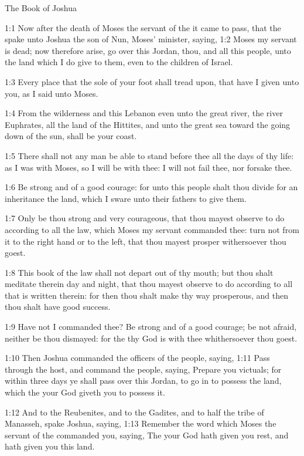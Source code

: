 The Book of Joshua


1:1 Now after the death of Moses the servant of the \LORD it came to
pass, that the \LORD spake unto Joshua the son of Nun, Moses' minister,
saying, 1:2 Moses my servant is dead; now therefore arise, go over
this Jordan, thou, and all this people, unto the land which I do give
to them, even to the children of Israel.

1:3 Every place that the sole of your foot shall tread upon, that have
I given unto you, as I said unto Moses.

1:4 From the wilderness and this Lebanon even unto the great river,
the river Euphrates, all the land of the Hittites, and unto the great
sea toward the going down of the sun, shall be your coast.

1:5 There shall not any man be able to stand before thee all the days
of thy life: as I was with Moses, so I will be with thee: I will not
fail thee, nor forsake thee.

1:6 Be strong and of a good courage: for unto this people shalt thou
divide for an inheritance the land, which I sware unto their fathers
to give them.

1:7 Only be thou strong and very courageous, that thou mayest observe
to do according to all the law, which Moses my servant commanded thee:
turn not from it to the right hand or to the left, that thou mayest
prosper withersoever thou goest.

1:8 This book of the law shall not depart out of thy mouth; but thou
shalt meditate therein day and night, that thou mayest observe to do
according to all that is written therein: for then thou shalt make thy
way prosperous, and then thou shalt have good success.

1:9 Have not I commanded thee? Be strong and of a good courage; be not
afraid, neither be thou dismayed: for the \LORD thy God is with thee
whithersoever thou goest.

1:10 Then Joshua commanded the officers of the people, saying, 1:11
Pass through the host, and command the people, saying, Prepare you
victuals; for within three days ye shall pass over this Jordan, to go
in to possess the land, which the \LORD your God giveth you to possess
it.

1:12 And to the Reubenites, and to the Gadites, and to half the tribe
of Manasseh, spake Joshua, saying, 1:13 Remember the word which Moses
the servant of the \LORD commanded you, saying, The \LORD your God hath
given you rest, and hath given you this land.

